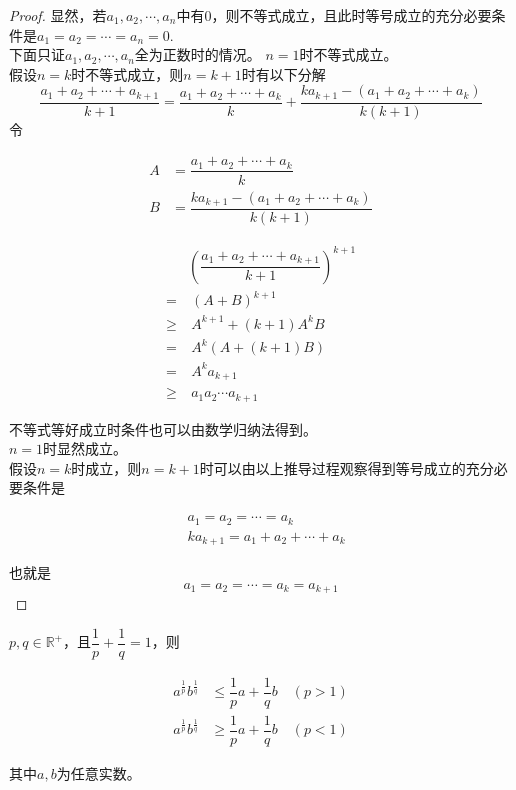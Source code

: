 \begin{proof}
    
    显然，若$a_1, a_2, \cdots, a_n$中有$0$，则不等式成立，且此时等号成立的充分必要条件是$a_1 = a_2 = \cdots = a_n = 0$. \\
    下面只证$a_1, a_2, \cdots, a_n$全为正数时的情况。
    $n = 1$时不等式成立。\\
    假设$n = k$时不等式成立，则$n = k + 1$时有以下分解
    \[\dfrac{a_1 + a_2 + \cdots + a_{k + 1}}{k + 1} = \dfrac{a_1 + a_2 + \cdots + a_{k}}{k} + \dfrac{ka_{k + 1} - (a_1 + a_2 + \cdots + a_k)}{k(k + 1)}\]
    令
    
    \begin{align*}
        A & = \dfrac{a_1 + a_2 + \cdots + a_{k}}{k} \\
        B & = \dfrac{ka_{k + 1} - (a_1 + a_2 + \cdots + a_k)}{k(k + 1)}
    \end{align*}

    \begin{align*}
        & \left( \dfrac{a_1 + a_2 + \cdots + a_{k + 1}}{k + 1} \right)^{k + 1} \\
        = & \  (A + B)^{k + 1} \\
        \geq & \  A^{k + 1} + (k + 1) A^k B \\
        = & \ A^k(A + (k + 1)B) \\
        = & \ A^k a_{k + 1} \\
        \geq & \ a_1 a_2 \cdots a_{k + 1}
    \end{align*}

    不等式等好成立时条件也可以由数学归纳法得到。\\
    $n = 1$时显然成立。\\
    假设$n = k$时成立，则$n = k + 1$时可以由以上推导过程观察得到等号成立的充分必要条件是

    \begin{align*}
        & a_1 = a_2 = \cdots = a_k \\
        & ka_{k + 1} = a_1 + a_2 + \cdots + a_k
    \end{align*}

    也就是
    \[a_1 = a_2 = \cdots = a_k = a_{k + 1}\]
\end{proof}

\begin{theorem}[Young不等式]

    $p, q \in \mathbb{R}^+$，且$\dfrac{1}{p} + \dfrac{1}{q} = 1$，则

    \begin{align*}
        a^{\frac{1}{p}} b^{\frac{1}{q}} & \leq \dfrac{1}{p}a + \dfrac{1}{q}b \quad (p > 1) \\
        a^{\frac{1}{p}} b^{\frac{1}{q}} & \geq \dfrac{1}{p}a + \dfrac{1}{q}b \quad (p < 1)
    \end{align*}

    其中$a, b$为任意实数。

\end{theorem}

